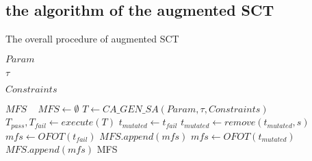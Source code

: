 \documentclass[10pt,journal,compsoc]{IEEEtran}
\begin{document}

\subsection{the algorithm of the augmented SCT}
\begin{algorithm}
  \caption{The overall procedure of augmented SCT}
  \begin{algorithmic}[1]
     \Require


     $Param$ 

     $\tau$ 

     $Constraints$  





\Ensure  $MFS$ 
\
       \State $MFS \leftarrow \emptyset$
       \State $T \leftarrow CA\_GEN\_SA(Param, \tau, Constraints)$
       \State $T_{pass}, T_{fail}\leftarrow execute(T)$
          \State $t_{mutated} \leftarrow t_{fail}$
          \State $t_{mutated} \leftarrow remove(t_{mutated}, s)$
         \EndIf
            \State  $mfs \leftarrow OFOT(t_{fail}) $
            \State $MFS.append(mfs) $
         \Else
                \State  $mfs \leftarrow OFOT(t_{mutated}) $
                \State $MFS.append(mfs) $
            \EndIf
         \EndIf
          \EndFor
       \EndFor
    \State \Return   MFS
  \end{algorithmic}
\end{algorithm}
\end{document}
